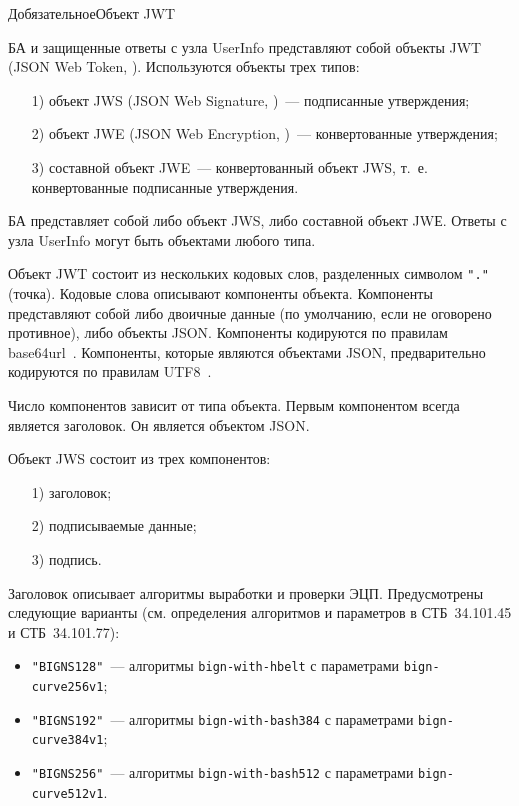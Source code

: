 \begin{appendix}{Д}{обязательное}{Объект JWT}\label{JWT}


БА и защищенные ответы с узла UserInfo представляют собой объекты 
JWT (JSON Web Token, \cite{RFC7519}).
%
Используются объекты трех типов: 
\begin{itemize}
\item[1)] 
объект JWS (JSON Web Signature, \cite{RFC7515})~--- подписанные утверждения;
\item[2)] 
объект JWE (JSON Web Encryption, \cite{RFC7516})~--- конвертованные утверждения;
\item[3)] 
составной объект JWE~--- конвертованный объект JWS, т.~е. конвертованные 
подписанные утверждения.
\end{itemize}

БА представляет собой либо объект JWS, либо составной объект JWЕ.
Ответы с узла UserInfo могут быть объектами любого типа. 

Объект JWT состоит из нескольких кодовых слов, разделенных символом
\lstinline{"."} (точка). Кодовые слова описывают компоненты объекта. 
%
Компоненты представляют собой либо двоичные данные (по умолчанию, если не 
оговорено противное), либо объекты JSON.
%
Компоненты кодируются по правилам base64url~\cite{RFC4648}. 
Компоненты, которые являются объектами JSON, предварительно кодируются по 
правилам UTF8~\cite{UTF8}.

Число компонентов зависит от типа объекта. Первым компонентом всегда является 
заголовок. Он является объектом JSON.

\label{JWT.JWS}

Объект JWS состоит из трех компонентов:
\begin{enumerate}
\item[1)]
заголовок;
\item[2)]
подписываемые данные;
\item[3)]
подпись.
\end{enumerate}

Заголовок описывает алгоритмы выработки и проверки ЭЦП. Предусмотрены следующие 
варианты (см. определения алгоритмов и параметров в СТБ~34.101.45 и 
СТБ~34.101.77): 
\begin{itemize}
\item
\lstinline{"BIGNS128"}~--- алгоритмы \lstinline{bign-with-hbelt} с параметрами  
\lstinline{bign-curve256v1};
\item
\lstinline{"BIGNS192"}~--- алгоритмы \lstinline{bign-with-bash384} с 
параметрами \lstinline{bign-curve384v1};
\item
\lstinline{"BIGNS256"}~--- алгоритмы \lstinline{bign-with-bash512} с 
параметрами \lstinline{bign-curve512v1}.
\end{itemize}


\end{appendix}
